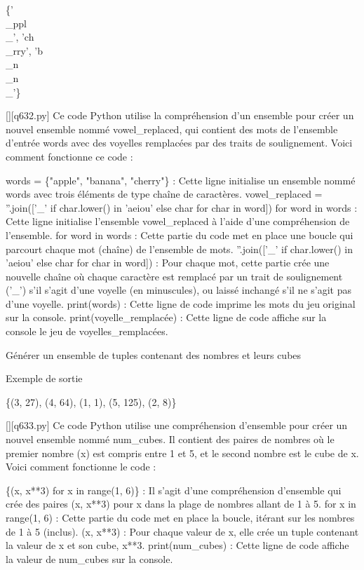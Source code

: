 \{'\\_ppl\\_', 'ch\\_rry', 'b\\_n\\_n\\_'\}
        \par
        \begin{solution}
            \renewcommand{\nomfichier}{q632.py}
            \pythonfile{\chemincode \nomfichier}[][\nomfichier]
            Ce code Python utilise la compréhension d'un ensemble pour créer un nouvel ensemble nommé vowel\_replaced, qui contient des mots de l'ensemble d'entrée words avec des voyelles remplacées par des traits de soulignement. Voici comment fonctionne ce code :

    words = \{"apple", "banana", "cherry"\} : Cette ligne initialise un ensemble nommé words avec trois éléments de type chaîne de caractères.
    vowel\_replaced = {''.join(['\_' if char.lower() in 'aeiou' else char for char in word]) for word in words} : Cette ligne initialise l'ensemble vowel\_replaced à l'aide d'une compréhension de l'ensemble.
        for word in words : Cette partie du code met en place une boucle qui parcourt chaque mot (chaîne) de l'ensemble de mots.
        ''.join(['\_' if char.lower() in 'aeiou' else char for char in word]) : Pour chaque mot, cette partie crée une nouvelle chaîne où chaque caractère est remplacé par un trait de soulignement ('\_') s'il s'agit d'une voyelle (en minuscules), ou laissé inchangé s'il ne s'agit pas d'une voyelle.
    print(words) : Cette ligne de code imprime les mots du jeu original sur la console.
    print(voyelle\_remplacée) : Cette ligne de code affiche sur la console le jeu de voyelles\_remplacées.
        \end{solution}
        

        \question
        Générer un ensemble de tuples contenant des nombres et leurs cubes

Exemple de sortie

\{(3, 27), (4, 64), (1, 1), (5, 125), (2, 8)\}
        \par
        \begin{solution}
            \renewcommand{\nomfichier}{q633.py}
            \pythonfile{\chemincode \nomfichier}[][\nomfichier]
            Ce code Python utilise une compréhension d'ensemble pour créer un nouvel ensemble nommé num\_cubes. Il contient des paires de nombres où le premier nombre (x) est compris entre 1 et 5, et le second nombre est le cube de x. Voici comment fonctionne le code :

    \{(x, x**3) for x in range(1, 6)\} : Il s'agit d'une compréhension d'ensemble qui crée des paires (x, x**3) pour x dans la plage de nombres allant de 1 à 5.
        for x in range(1, 6) : Cette partie du code met en place la boucle, itérant sur les nombres de 1 à 5 (inclus).
        (x, x**3) : Pour chaque valeur de x, elle crée un tuple contenant la valeur de x et son cube, x**3.
    print(num\_cubes) : Cette ligne de code affiche la valeur de num\_cubes sur la console.
        \end{solution}
        

